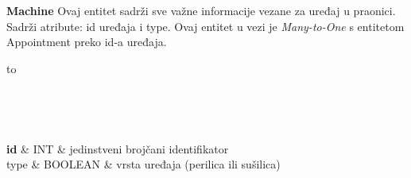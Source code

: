 			
			\noindent\textbf{Machine}  Ovaj entitet sadrži sve važne informacije vezane za uređaj u praonici. Sadrži atribute: id uređaja i type. Ovaj entitet u vezi je \textit{Many-to-One} s entitetom Appointment preko id-a uređaja.
			
			\begin{longtabu} to \textwidth {|X[8, l]|X[6, l]|X[20, l]|}
				
				\hline {}	 \\[3pt] \hline
				\endfirsthead
				
				\hline {}	 \\[3pt] \hline
				\endhead
				
				\hline 
				\endlastfoot
				
				\textbf{id} & INT	&  jedinstveni brojčani identifikator	\\ \hline
				type & BOOLEAN &  vrsta uređaja (perilica ili sušilica)\\ \hline 
				
				
			\end{longtabu}
		
